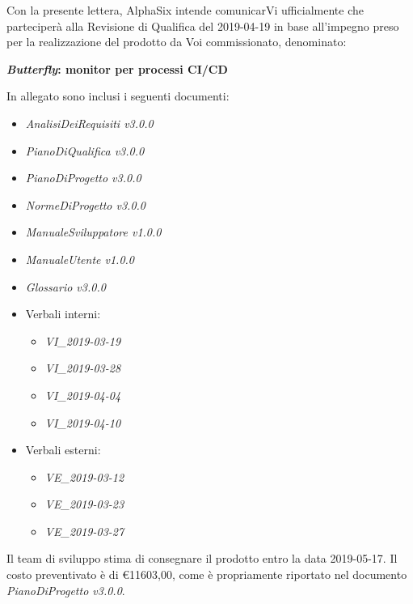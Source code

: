\documentclass[12pt]{letter} %
\newcommand{\DAlt}{\ped{\tiny{D}}}
\newcommand{\Doc}[1]{\textit{#1}\DAlt}
\begin{document}
\begin{letter}
	\begin{addmargin}[2em]{2em}
		\hspace{1cm} %
		Con la presente lettera, AlphaSix intende comunicarVi ufficialmente che parteciperà alla Revisione di Qualifica del 2019-04-19 in base all'impegno preso
		per la realizzazione del prodotto da Voi commissionato, denominato:
		\begin{center}
			\textbf{\textit{Butterfly}: monitor per processi CI/CD}
		\end{center}
		In allegato sono inclusi i seguenti documenti:
		\begin{itemize}
			\item \Doc{AnalisiDeiRequisiti v3.0.0}
			\item \Doc{PianoDiQualifica v3.0.0}
			\item \Doc{PianoDiProgetto v3.0.0}
			\item \Doc{NormeDiProgetto v3.0.0}
            \item \Doc{ManualeSviluppatore v1.0.0}
            \item \Doc{ManualeUtente v1.0.0}
			\item \Doc{Glossario v3.0.0}
			\item Verbali interni:
			\begin{itemize}
				\item \Doc{VI\_2019-03-19}
				\item \Doc{VI\_2019-03-28}
				\item \Doc{VI\_2019-04-04}
				\item \Doc{VI\_2019-04-10}
			\end{itemize}
			\item Verbali esterni:
			\begin{itemize}
				\item \Doc{VE\_2019-03-12}
                \item \Doc{VE\_2019-03-23}
                \item \Doc{VE\_2019-03-27}
			\end{itemize}
      	\end{itemize}

		Il team di sviluppo stima di consegnare il prodotto entro la data 2019-05-17.
		Il costo preventivato è di \mbox{\euro 11603,00},
		come è propriamente riportato nel documento \Doc{PianoDiProgetto v3.0.0}.


\end{addmargin}
\end{letter}
\end{document}
